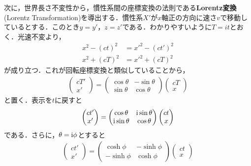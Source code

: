 \documentclass{report}
\begin{document}
  次に，世界長さ不変性から，慣性系間の座標変換の法則である\textbf{Lorentz変換}(Lorentz Transformation)を導出する．慣性系$X'$が$x$軸正の方向に速さ$v$で移動しているとする．このとき$y=y'，z=z'$である．わかりやすいように$T=it$とおく．光速不変より，
  \begin{align}
    x^2 - (ct)^2 &= x'^2 - (ct')^2\\
    x^2 + (cT)^2 &= x'^2 + (cT)^2
  \end{align}
  が成り立つ．これが回転座標変換と類似していることから，
  \begin{align}
    \begin{pmatrix}
      cT' \\ x'
    \end{pmatrix}
    =
    \begin{pmatrix}
      \cos\theta & -\sin\theta\\
      \sin\theta & \cos\theta
    \end{pmatrix}
    \begin{pmatrix}
      cT\\x
    \end{pmatrix}
  \end{align}
  と置く．表示を$t$に戻すと
  \begin{align}
    \begin{pmatrix}
      ct' \\ x'
    \end{pmatrix}
    =
    \begin{pmatrix}
      \cos\theta & \mathrm{i}\sin\theta\\
      \mathrm{i}\sin\theta & \cos\theta
    \end{pmatrix}
    \begin{pmatrix}
      ct\\x
    \end{pmatrix}
  \end{align}
  である．さらに，$\theta = \mathrm{i}\phi$とすると
  \begin{align}
    \begin{pmatrix}
      ct' \\ x'
    \end{pmatrix}
    =
    \begin{pmatrix}
      \cosh\phi & -\sinh\phi\\
      -\sinh\phi & \cosh\phi
    \end{pmatrix}
    \begin{pmatrix}
      ct\\x
    \end{pmatrix}
  \end{align}
\end{document}
